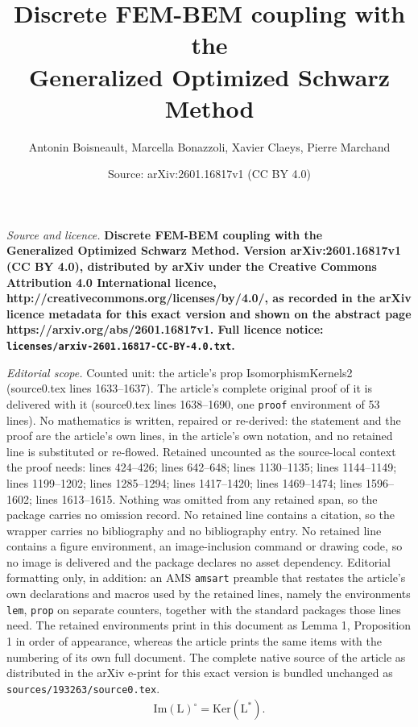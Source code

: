\documentclass[10pt,a4paper]{amsart}
\title{\bf Discrete FEM-BEM coupling with the\\ Generalized Optimized Schwarz Method}
\author{Antonin Boisneault, Marcella Bonazzoli, Xavier Claeys, Pierre Marchand}
\date{Source: arXiv:2601.16817v1 (CC BY 4.0)}
\newcommand{\mL}{\mathrm{L}}
\newcommand{\mrm}{\mathrm}
\begin{document}
\maketitle

\noindent\emph{Source and licence.} \bf Discrete FEM-BEM coupling with the\\ Generalized Optimized Schwarz Method. Version arXiv:2601.16817v1 (CC BY 4.0), distributed by arXiv under the Creative Commons Attribution 4.0 International licence, http://creativecommons.org/licenses/by/4.0/, as recorded in the arXiv licence metadata for this exact version and shown on the abstract page https://arxiv.org/abs/2601.16817v1. Full licence notice: \texttt{licenses/arxiv-2601.16817-CC-BY-4.0.txt}.\par\smallskip

\noindent\textit{Editorial scope.} Counted unit: the article's prop IsomorphismKernels2 (source0.tex lines 1633--1637). The article's complete original proof of it is delivered with it (source0.tex lines 1638--1690, one \texttt{proof} environment of 53 lines). No mathematics is written, repaired or re-derived: the statement and the proof are the article's own lines, in the article's own notation, and no retained line is substituted or re-flowed.  Retained uncounted as the source-local context the proof needs: lines 424--426; lines 642--648; lines 1130--1135; lines 1144--1149; lines 1199--1202; lines 1285--1294; lines 1417--1420; lines 1469--1474; lines 1596--1602; lines 1613--1615.  Nothing was omitted from any retained span, so the package carries no omission record.  No retained line contains a citation, so the wrapper carries no bibliography and no bibliography entry.  No retained line contains a figure environment, an image-inclusion command or drawing code, so no image is delivered and the package declares no asset dependency.  Editorial formatting only, in addition: an AMS \texttt{amsart} preamble that restates the article's own declarations and macros used by the retained lines, namely the environments \texttt{lem}, \texttt{prop} on separate counters, together with the standard packages those lines need.  The retained environments print in this document as Lemma 1, Proposition 1 in order of appearance, whereas the article prints the same items with the numbering of its own full document.  The complete native source of the article as distributed in the arXiv e-print for this exact version is bundled unchanged as \texttt{sources/193263/source0.tex}.
\begin{align}\label{eq:polarOfImage}
  \mrm{Im}(\mL)^{\circ} = \mrm{Ker} (\mL^*).
\end{align}
\end{document}
